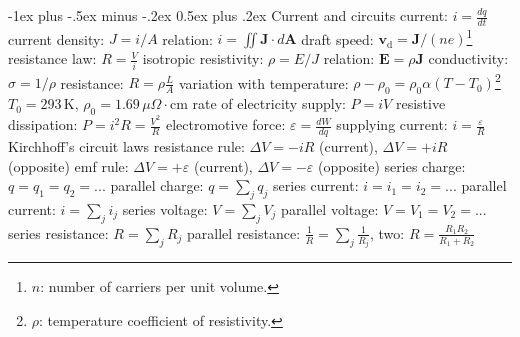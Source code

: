\documentclass[10pt,landscape]{article}
\makeatletter
\renewcommand{\subsection}{\@startsection{subsection}{2}{0mm}%
                                {-1ex plus -.5ex minus -.2ex}%
                                {0.5ex plus .2ex}%
                                {\normalfont\normalsize\bfseries}}
\newcommand{\spc}{\hspace*{1em}}
\makeatother
\begin{document}
\begin{multicols*}{3}
\subsection{Current and circuits}
current: $i=\frac{dq}{dt}$
\newline
current density: $J=i/A$
\newline
\spc relation: $i=\iint \mathbf{J}\cdot d\mathbf{A}$
\newline
\spc draft speed: $\mathbf{v}_\mathrm{d}=\mathbf{J}/(ne)$\footnote{ $n$: number of carriers per unit volume.}
\newline
resistance law: $R=\frac{V}{i}$
\newline
isotropic resistivity: $\rho=E/J$
\newline
\spc relation: $\mathbf{E}=\rho \mathbf{J}$
\newline
conductivity: $\sigma =1/\rho $
\newline
resistance: $R=\rho \frac{L}{A}$
\newline
\spc variation with temperature: $\rho -\rho _0=\rho _0\alpha (T-T_0)$\footnote{$\rho$: temperature coefficient of resistivity.}
\newline
\spc \spc$T_0=293\,\textrm{K}$, $\rho_0=1.69\,\mu\Omega\cdot\textrm{cm}$
\newline
rate of electricity supply: $P=iV$
\newline
\spc resistive dissipation: $P=i^2R=\frac{V^2}{R}$
\newline
electromotive force: $\varepsilon =\frac{dW}{dq}$
\newline
\spc supplying current: $i=\frac{\varepsilon }{R}$
\newline \newline
Kirchhoff's circuit laws
\newline
\spc resistance rule: $\Delta V=-iR$ (current), $\Delta V=+iR$ (opposite)
\newline
\spc emf rule: $\Delta V=+\varepsilon $ (current), $\Delta V=-\varepsilon $ (opposite)
\newline \newline
series charge: $q=q_1=q_2=...$
\newline
parallel charge: $q=\sum_j q_j$
\newline
series current: $i=i_1=i_2=...$
\newline
parallel current: $i=\sum_j i_j$
\newline
series voltage: $V=\sum _j V_j$
\newline
parallel voltage: $V=V_1=V_2=...$
\newline
series resistance: $R=\sum _j R_j$
\newline
parallel resistance: $\frac{1}{R}=\sum _j \frac{1}{R_j}$, two: $R=\frac{R_1R_2}{R_1+R_2}$
\newpage


\end{multicols*}
\end{document}
